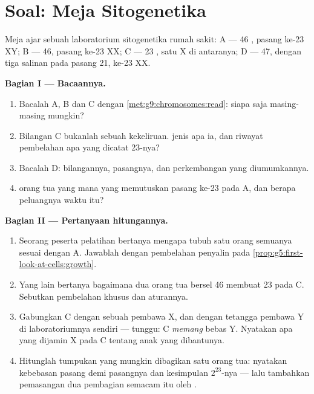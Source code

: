 \section{Soal: Meja Sitogenetika}

\begin{problem}\label{pb:g9:chromosomes:1}
Meja ajar sebuah laboratorium sitogenetika rumah sakit:
 A --- 46 , pasang ke-23 XY; B --- 46,
pasang ke-23 XX; C --- 23 , satu X di antaranya;
D --- 47, dengan tiga salinan pada pasang 21, ke-23 XX.

\medskip\noindent\textbf{Bagian I --- Bacaannya.}
\begin{enumerate}
  \item Bacalah A, B dan C dengan
        \cref{met:g9:chromosomes:read}:  siapa saja
        masing-masing mungkin?
  \item Bilangan C bukanlah sebuah kekeliruan.  jenis apa
        ia, dan riwayat pembelahan apa yang dicatat 23-nya?
  \item Bacalah D: bilangannya, pasangnya, dan perkembangan
        yang diumumkannya.
  \item {} orang tua yang mana yang memutuskan pasang
        ke-23 pada A, dan berapa peluangnya waktu itu?
\end{enumerate}

\medskip\noindent\textbf{Bagian II --- Pertanyaan
hitungannya.}
\begin{enumerate}[resume]
  \item Seorang peserta pelatihan bertanya mengapa  tubuh
        satu orang semuanya sesuai dengan  A.
        Jawablah dengan pembelahan penyalin pada
        \cref{prop:g5:first-look-at-cells:growth}.
  \item Yang lain bertanya bagaimana dua orang tua bersel 46
        membuat 23 pada C. Sebutkan pembelahan khusus dan aturannya.
  \item Gabungkan C dengan sebuah  pembawa X, dan
        dengan tetangga pembawa Y di laboratoriumnya sendiri
        --- tunggu: C \emph{memang} bebas Y. Nyatakan apa
        yang dijamin X pada C tentang anak yang dibantunya.
  \item Hitunglah tumpukan yang mungkin dibagikan satu orang
        tua: nyatakan kebebasan pasang demi pasangnya dan
        kesimpulan $2^{23}$-nya --- lalu tambahkan pemasangan
        dua pembagian semacam itu oleh .
\end{enumerate}


\end{problem}
